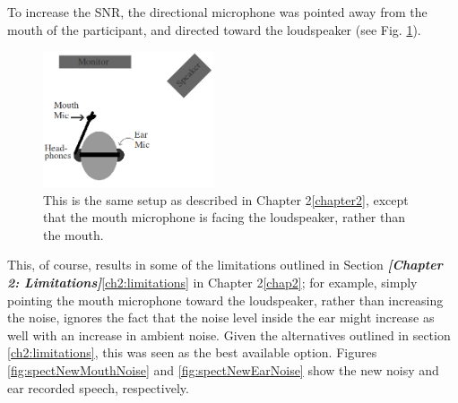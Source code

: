 \documentclass[dissertation,copyright]{uathesis}
\begin{document}
To increase the SNR, the directional microphone was pointed away from the mouth of the participant, and directed toward the loudspeaker (see Fig. \ref{fig:overallSetUp_new}).  
%
\begin{figure}
\centering
  \includegraphics[width=0.45\textwidth]{figure/overallSetUp_new.png}
  \caption{This is the same setup as described in Chapter 2\ref{chapter2}, except that the mouth microphone is facing the loudspeaker, rather than the mouth.}
  \label{fig:overallSetUp_new}
\end{figure}
%
This, of course, results in some of the limitations outlined in Section \textit{\textbf{[Chapter 2: Limitations]}}\ref{ch2:limitations} in Chapter 2\ref{chap2}; for example, simply pointing the mouth microphone toward the loudspeaker, rather than increasing the noise, ignores the fact that the noise level inside the ear might increase as well with an increase in ambient noise.  Given the alternatives outlined in section \ref{ch2:limitations}, this was seen as the best available option.  Figures \ref{fig:spectNewMouthNoise} and \ref{fig:spectNewEarNoise} show the new noisy and ear recorded speech, respectively.
%
\end{document}
